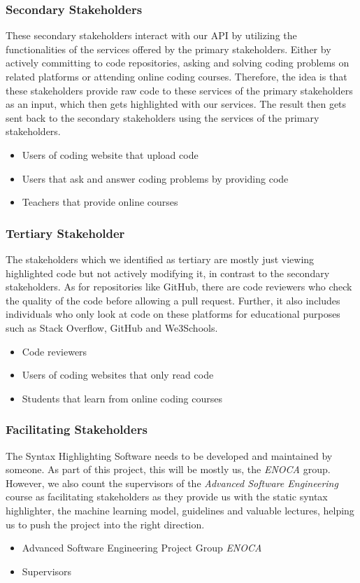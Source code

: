 \documentclass[11pt]{article}
\begin{document}
\subsubsection*{Secondary Stakeholders}
These secondary stakeholders interact with our API by utilizing the functionalities of the services offered by the primary stakeholders. Either by actively committing to code repositories, asking and solving coding problems on related platforms or attending online coding courses. Therefore, the idea is that these stakeholders provide raw code to these services of the primary stakeholders as an input, which then gets highlighted with our services. The result then gets sent back to the secondary stakeholders using the services of the primary stakeholders.
\begin{itemize}
\item Users of coding website that upload code
\item Users that ask and answer coding problems by providing code
\item Teachers that provide online courses
\end{itemize}

\subsubsection*{Tertiary Stakeholder}
The stakeholders which we identified as tertiary are mostly just viewing highlighted code but not actively modifying it, in contrast to the secondary stakeholders. As for repositories like GitHub, there are code reviewers who check the quality of the code before allowing a pull request. Further, it also includes individuals who only look at code on these platforms for educational purposes such as Stack Overflow, GitHub and We3Schools.
\begin{itemize}
\item Code reviewers
\item Users of coding websites that only read code
\item Students that learn from online coding courses
\end{itemize}

\subsubsection*{Facilitating Stakeholders}
The Syntax Highlighting Software needs to be developed and maintained by someone. As part of this project, this will be mostly us, the \textit{ENOCA} group. However, we also count the supervisors of the \textit{Advanced Software Engineering} course as facilitating stakeholders as they provide us with the static syntax highlighter, the machine learning model, guidelines and valuable lectures, helping us to push the project into the right direction.
\begin{itemize}
    \item Advanced Software Engineering Project Group \textit{ENOCA}
    \item Supervisors
\end{itemize}
\end{document}
